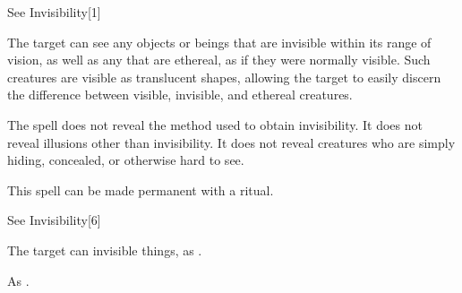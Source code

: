\begin{spellsection}{See Invisibility}[1]
    \begin{spellheader}
    \end{spellheader}
    \begin{spellcontent}
        \begin{spelltargetinginfo}
        \end{spelltargetinginfo}
        \begin{spelleffects}
            \spelleffect The target can see any objects or beings that are invisible within its range of vision, as well as any that are ethereal, as if they were normally visible. Such creatures are visible as translucent shapes, allowing the target to easily discern the difference between visible, invisible, and ethereal creatures.
            \spelldur \durpersonallong
        \end{spelleffects}
    \end{spellcontent}
    \begin{spellfooter}
        \spellnotes The spell does not reveal the method used to obtain invisibility. It does not reveal illusions other than invisibility. It does not reveal creatures who are simply hiding, concealed, or otherwise hard to see.

        This spell can be made permanent with a  ritual.
        \miscastexplode
    \end{spellfooter}
\end{spellsection}

\begin{spellsection}[Mass]{See Invisibility}[6]
    \begin{spellheader}
    \end{spellheader}
    \begin{spellcontent}
        \begin{spelltargetinginfo}
        \end{spelltargetinginfo}
        \begin{spelleffects}
            \spelleffect The target can invisible things, as .
            \spelldur \durlong
        \end{spelleffects}
    \end{spellcontent}
    \begin{spellfooter}
        \spellnotes As .
        \miscastexplode
    \end{spellfooter}
\end{spellsection}

